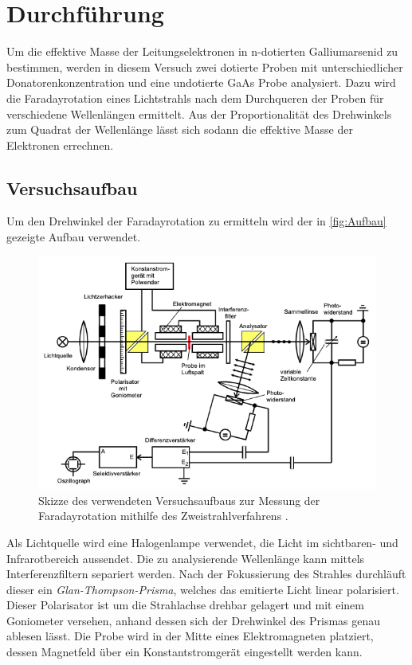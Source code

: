 \section{Durchführung}
\label{sec:Durchführung}
Um die effektive Masse der Leitungselektronen in n-dotierten Galliumarsenid zu bestimmen, werden in diesem Versuch zwei dotierte Proben mit unterschiedlicher 
Donatorenkonzentration und eine undotierte GaAs Probe analysiert. Dazu wird die Faradayrotation eines Lichtstrahls nach dem Durchqueren der Proben für 
verschiedene Wellenlängen ermittelt. Aus der Proportionalität des Drehwinkels zum Quadrat der Wellenlänge lässt sich sodann die effektive Masse der Elektronen
errechnen.

\subsection{Versuchsaufbau}
\label{subsec:Versuchsaufbau}
Um den Drehwinkel der Faradayrotation zu ermitteln wird der in \autoref{fig:Aufbau} gezeigte Aufbau verwendet.
\begin{figure}
    \centering
    \includegraphics[width=.8\textwidth]{content/pics/Aufbau.png}
    \caption{Skizze des verwendeten Versuchsaufbaus zur Messung der Faradayrotation mithilfe des Zweistrahlverfahrens \cite{V46}.}
    \label{fig:Aufbau}
\end{figure}
Als Lichtquelle wird eine Halogenlampe verwendet, die Licht im sichtbaren- und Infrarotbereich aussendet. Die zu analysierende Wellenlänge kann mittels 
Interferenzfiltern separiert werden. Nach der Fokussierung des Strahles durchläuft dieser ein \textit{Glan-Thompson-Prisma}, welches das emitierte Licht 
linear polarisiert. Dieser Polarisator ist um die Strahlachse drehbar gelagert und mit einem Goniometer versehen, anhand dessen sich der Drehwinkel des Prismas 
genau ablesen lässt. Die Probe wird in der Mitte eines Elektromagneten platziert, dessen Magnetfeld über ein Konstantstromgerät eingestellt werden kann. 
